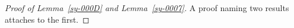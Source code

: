 \begin{proof}[Proof of Lemma~\ref{sy-000D} and Lemma~\ref{sy-0007}]
A proof naming two results attaches to the first.
\end{proof}